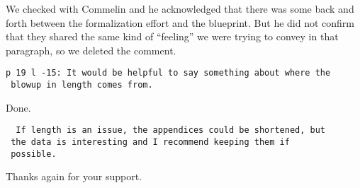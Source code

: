 \documentclass[runningheads]{llncs}
\begin{document}
We checked with Commelin and he acknowledged that there was some
back and forth between the formalization effort and the
blueprint. But he did not confirm that they shared the same kind of
“feeling” we were trying to convey in that paragraph, so we deleted
the comment. 

\begin{verbatim}
p 19 l -15: It would be helpful to say something about where the
 blowup in length comes from.
\end{verbatim}

Done.

\begin{verbatim}
  If length is an issue, the appendices could be shortened, but
 the data is interesting and I recommend keeping them if
 possible.
\end{verbatim}

Thanks again for your support.
\end{document}
